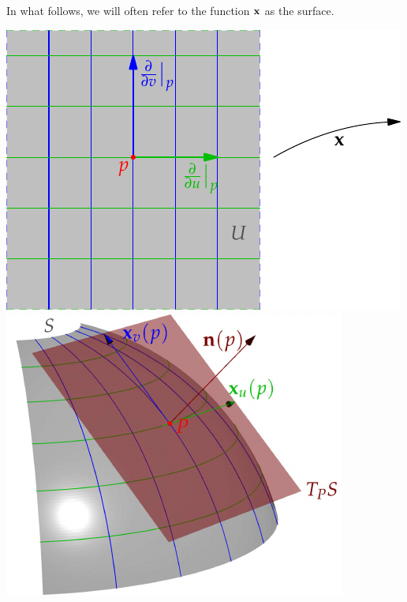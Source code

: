 In what follows, we will often refer to the function ${\mathbf{x}}$ as the surface.\smallbreak



\begin{center}\label{sec:map}
\includegraphics{surfaces-paramU}\quad\href{http://www.math.uci.edu/~ndonalds/math162a/surfaces-param.html}{\includegraphics{surfaces-param}}
\end{center}


